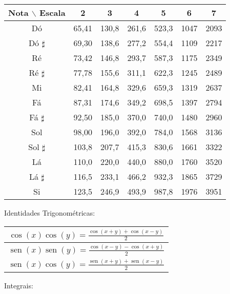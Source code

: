 \documentclass[10pt,a4paper]{article}%
\renewcommand{\sin}{\operatorname{sen}}
\begin{document}
{{{{{\begin{minipage}[l]{8.5cm}
{ {\tabulinesep=1.1mm
\begin{tabu}{|c|c|c|c|c|c|c|}
\hline
Nota  $\backslash$ Escala 	&	2&3	&4&5&6&7	\\ \hline
D\'{o}	&	65,41	&	130,8	&	261,6	&	523,3	&	1047	&	2093	\\ \hline
D\'{o} $\sharp$	&	69,30	&	138,6	&	277,2	&	554,4	&	1109	&	2217	\\ \hline
R\'{e}	&	73,42	&	146,8	&	293,7	&	587,3	&	1175	&	2349	\\ \hline
R\'{e} $\sharp$	&	77,78	&	155,6	&	311,1	&	622,3	&	1245	&	2489	\\ \hline
Mi	&	82,41	&	164,8	&	329,6	&	659,3	&	1319	&	2637	\\ \hline
F\'{a}	&	87,31	&	174,6	&	349,2	&	698,5	&	1397	&	2794	\\ \hline
F\'{a} $\sharp$	&	92,50	&	185,0	&	370,0	&	740,0	&	1480	&	2960	\\ \hline
Sol	&	98,00	&	196,0	&	392,0	&	784,0	&	1568	&	3136	\\ \hline
Sol $\sharp$	&	103,8	&	207,7	&	415,3	&	830,6	&	1661	&	3322	\\ \hline
L\'{a}	&	110,0	&	220,0	&	440,0	&	880,0	&	1760	&	3520	\\ \hline
L\'{a} $\sharp$	&	116,5	&	233,1	&	466,2	&	932,3	&	1865	&	3729	\\ \hline
Si	&	123,5	&	246,9	&	493,9	&	987,8	&	1976	&	3951	\\ \hline

 \end{tabu}}
}
\end{minipage}\hfill\begin{minipage}[r]{8.0cm}
{\footnotesize 
Identidades Trigonométricas:

{\tabulinesep=1.2mm
\begin{tabu}{|c|} 
\hline
 $\cos(x) \cos(y) = \frac {\cos(x+y) + \cos(x-y)}{2}$\\\hline
 $\sin(x) \sin(y) = \frac {\cos(x-y) - \cos(x+y)}{2}$\\\hline
 $\sin(x) \cos(y) = \frac {\sin(x+y) + \sin(x-y)}{2}$\\\hline
\end{tabu}}
}

\vspace{10pt}

{\footnotesize 
Integrais:

}
\end{minipage}}}}}}
\end{document}
